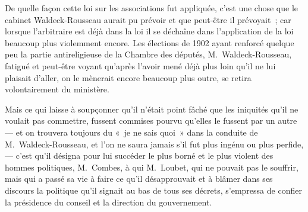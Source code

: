 \documentclass[french,twoside]{book} %
\newcommand{\astertri}{\medskip\par\centerline{\color{rubric}\large\selectfont{\syms ✻\,✻\,✻}}\medskip\par}%
\begin{document}
\astertri

\noindent De quelle façon cette loi sur les associations fut appliquée, c’est une chose que le cabinet Waldeck-Rousseau aurait pu prévoir et que peut-être il prévoyait ; car lorsque l’arbitraire est déjà dans la loi il se déchaîne dans l’application de la loi beaucoup plus violemment encore. Les élections de 1902 ayant renforcé quelque peu la partie antireligieuse de la Chambre des  députés, M. Waldeck-Rousseau, fatigué et peut-être voyant qu’après l’avoir mené déjà plus loin qu’il ne lui plaisait d’aller, on le mènerait encore beaucoup plus outre, se retira volontairement du ministère.\par
Mais ce qui laisse à soupçonner qu’il n’était point fâché que les iniquités qu’il ne voulait pas commettre, fussent commises pourvu qu’elles le fussent par un autre — et on trouvera toujours du « je ne sais quoi » dans la conduite de M. Waldeck-Rousseau, et l’on ne saura jamais s’il fut plus ingénu ou plus perfide, — c’est qu’il désigna pour lui succéder le plus borné et le plus violent des hommes politiques, M. Combes, à qui M. Loubet, qui ne pouvait pas le souffrir, mais qui a passé sa vie à faire ce qu’il désapprouvait et à blâmer dans ses discours la politique qu’il signait au bas de tous ses décrets, s’empressa de confier la présidence du conseil et la direction du gouvernement.\par

\astertri
\end{document}
